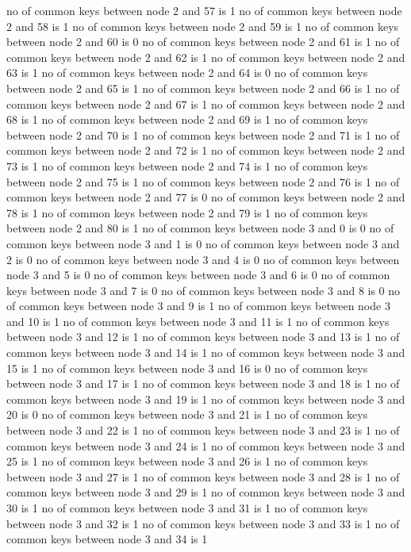 no of common keys between node 2 and 57 is 1
no of common keys between node 2 and 58 is 1
no of common keys between node 2 and 59 is 1
no of common keys between node 2 and 60 is 0
no of common keys between node 2 and 61 is 1
no of common keys between node 2 and 62 is 1
no of common keys between node 2 and 63 is 1
no of common keys between node 2 and 64 is 0
no of common keys between node 2 and 65 is 1
no of common keys between node 2 and 66 is 1
no of common keys between node 2 and 67 is 1
no of common keys between node 2 and 68 is 1
no of common keys between node 2 and 69 is 1
no of common keys between node 2 and 70 is 1
no of common keys between node 2 and 71 is 1
no of common keys between node 2 and 72 is 1
no of common keys between node 2 and 73 is 1
no of common keys between node 2 and 74 is 1
no of common keys between node 2 and 75 is 1
no of common keys between node 2 and 76 is 1
no of common keys between node 2 and 77 is 0
no of common keys between node 2 and 78 is 1
no of common keys between node 2 and 79 is 1
no of common keys between node 2 and 80 is 1
no of common keys between node 3 and 0 is 0
no of common keys between node 3 and 1 is 0
no of common keys between node 3 and 2 is 0
no of common keys between node 3 and 4 is 0
no of common keys between node 3 and 5 is 0
no of common keys between node 3 and 6 is 0
no of common keys between node 3 and 7 is 0
no of common keys between node 3 and 8 is 0
no of common keys between node 3 and 9 is 1
no of common keys between node 3 and 10 is 1
no of common keys between node 3 and 11 is 1
no of common keys between node 3 and 12 is 1
no of common keys between node 3 and 13 is 1
no of common keys between node 3 and 14 is 1
no of common keys between node 3 and 15 is 1
no of common keys between node 3 and 16 is 0
no of common keys between node 3 and 17 is 1
no of common keys between node 3 and 18 is 1
no of common keys between node 3 and 19 is 1
no of common keys between node 3 and 20 is 0
no of common keys between node 3 and 21 is 1
no of common keys between node 3 and 22 is 1
no of common keys between node 3 and 23 is 1
no of common keys between node 3 and 24 is 1
no of common keys between node 3 and 25 is 1
no of common keys between node 3 and 26 is 1
no of common keys between node 3 and 27 is 1
no of common keys between node 3 and 28 is 1
no of common keys between node 3 and 29 is 1
no of common keys between node 3 and 30 is 1
no of common keys between node 3 and 31 is 1
no of common keys between node 3 and 32 is 1
no of common keys between node 3 and 33 is 1
no of common keys between node 3 and 34 is 1
